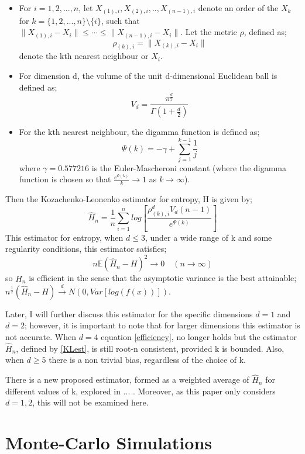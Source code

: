 \documentclass{article}
\begin{document}
\begin{itemize}

\item For $i = 1, 2, ..., n$, let $X_{(1), i}, X_{(2), i}, .., X_{(n-1), i}$ denote an order of the $X_{k}$ for $k = \{1, 2, ..., n\} \setminus \{i\}$, such that $\| X_{(1), i} - X_{i}\| \leq \cdots \leq \|  X_{(n-1), i} - X_{i}\| $. Let the metric $\rho$, defined as;
\begin{equation}
\rho_{(k), i} = \| X_{(k), i} - X_{i}\|
\end{equation} denote the kth nearest neighbour or $X_{i}$.

\item  For dimension d, the volume of the unit d-dimensional Euclidean ball is defined as;
\begin{equation}
V_{d} = \frac{\pi^\frac{d}{2}}{\Gamma(1 + \frac{d}{2})}
\end{equation}

\item For the kth nearest neighbour, the digamma function is defined as;
\begin{equation}
\Psi(k) = -\gamma + \sum_{j=1}^{k-1} \frac{1}{j}
\end{equation}
where $\gamma = 0.577216$ is the Euler-Mascheroni constant (where the digamma function is chosen so that $\frac{e^{\Psi(k)}}{k}\to1$ as $k \to \infty$).

\end{itemize} Then the Kozachenko-Leonenko estimator for entropy, H is given by;
\begin{equation} \label{KLest}
\hat{H}_{n} = \frac{1}{n} \sum_{i=1}^{n} log \left[ \frac{\rho_{(k),i}^{d} V_{d} (n-1)}{e^{\Psi(k)}} \right]
\end{equation} This estimator for entropy, when $d \leq 3$, under a wide range of k and some regularity conditions, this estimator satisfies;
\begin{equation} \label{efficiency}
n \mathbb{E} {(\hat{H}_{n} - H)^2} \to 0 \quad  (n \to \infty)
\end{equation} so $\hat{H}_{n}$ is efficient in the sense that the asymptotic variance is the best attainable; $n^{\frac{1}{2}}(\hat{H}_{n} - H) \xrightarrow{d} N(0, Var[log(f(x))])$.

Later, I will further discuss this estimator for the specific dimensions $d=1$ and $d=2$; however, it is important to note that for larger dimensions this estimator is not accurate. When $d=4$ equation \ref{efficiency}, no longer holds but the estimator $\hat{H}_{n}$, defined by \ref{KLest}, is still root-n consistent, provided k is bounded. Also, when $d \geq 5$ there is a non trivial bias, regardless of the choice of k. 

There is a new proposed estimator, formed as a weighted average of $\hat{H}_{n}$ for different values of k, explored in ... . Moreover, as this paper only considers $d=1, 2$, this will not be examined here.

\section{Monte-Carlo Simulations}
\end{document}
